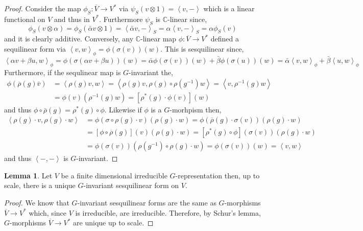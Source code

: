 \documentclass[12pt]{extarticle}
\theoremstyle{definition}
\newtheorem{lemma}[theorem]{Lemma}
\newcommand{\C}{\mathbb{C}}
\newcommand{\inner}[2]{\left< #1, #2 \right>}
\begin{document}
\begin{proof}
Consider the map $\phi_S : \overline{V} \to V^*$ via $\psi_S(v \otimes 1) = \inner{v}{-}$ which is a linear functional on $V$ and thus in $V^*$. Furthermore $\psi_S$ is $\C$-linear since,
\[ \phi_S(v \otimes \alpha) = \phi_S(\bar{\alpha} v \otimes 1) = \inner{\bar{\alpha} v}{-}_S = \alpha \inner{v}{-}_S = \alpha \phi_S(v) \]
and it is clearly additive. Conversely, any $\C$-linear map $\phi : \overline{V} \to V^*$ defined a sequilinear form via $\inner{v}{w}_{\phi} = \phi(\sigma(v))(w)$. This is sesquilinear since,
\[ \inner{\alpha v + \beta u}{w}_\phi = \phi(\sigma(\alpha v + \beta u))(w) = \bar{\alpha} \phi(\sigma(v))(w) + \bar{\beta} \phi(\sigma(u))(w) = \bar{\alpha} \inner{v}{w}_\phi + \bar{\beta} \inner{u}{w}_\phi \]
Furthermore, if the sequlinear map is $G$-invariant the,
\begin{align*}
\phi(\overline{\rho}(g) \bar{v}) & = \inner{\rho(g) v}{w} = \inner{\rho(g) v}{\rho(g) \circ \rho(g^{-1}) w} = \inner{v}{\rho^{-1}(g)w}
\\
& = \phi(v)(\rho^{-1}(g)w) = [\rho^*(g) \cdot \phi(v)](w)
\end{align*}
and thus $\phi \circ \bar{\rho}(g) = \rho^*(g) \circ \phi$. Likewise if $\phi$ is a $G$-morhpism then,
\begin{align*}
\inner{\rho(g) \cdot v}{\rho(g) \cdot w} & = \phi(\sigma \circ \rho(g) \cdot v)(\rho(g) \cdot w) = \phi(\overline{\rho}(g) \cdot \sigma(v))(\rho(g) \cdot w) 
\\
& = [ \phi \circ \overline{\rho}(g)](v)(\rho(g) \cdot w) = [\rho^*(g) \circ \phi](\sigma(v))(\rho(g) \cdot w) 
\\
& = \phi(\sigma(v))(\rho(g^{-1}) \circ \rho(g) \cdot w) = \phi(\sigma(v))(w) = \inner{v}{w}
\end{align*}
and thus $\inner{-}{-}$ is $G$-invariant.
\end{proof}

\begin{lemma}
Let $V$ be a finite dimensional irreducible $G$-representation then, up to scale, there is a unique $G$-invariant sesquilinear form on $V$.
\end{lemma}

\begin{proof}
We know that $G$-invariant sesquilinear forms are the same as $G$-morphisms $\overline{V} \to V^*$ which, since $V$ is irreducible, are irreducible. Therefore, by Schur's lemma, $G$-morphisms $\overline{V} \to V^*$ are unique up to scale. 
\end{proof}
\end{document}
